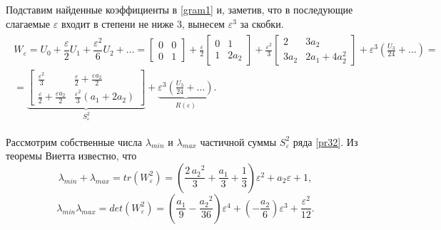 \documentclass[../main.tex]{subfiles}
\begin{document}
 Подставим найденные коэффициенты в \eqref{gram1} и, заметив, что в последующие слагаемые $ \varepsilon $ входит в степени не ниже $ 3 $, вынесем $ \varepsilon^3 $ за скобки.
 \begin{gather}\label{pr32}
	 \begin{gathered}
		 W_{\varepsilon} = U_0 + \dfrac{\varepsilon}{2} U_1 + \dfrac{\varepsilon^2}{6}U_2 + \dots = \left[ {\begin{array}{*{20}{c}}
				 0&0\\
				 0&1
		 \end{array}}\right] +\frac{\varepsilon}{2} \left[ {\begin{array}{*{20}{c}}
				 0&1\\
				 1&2a_2
		 \end{array}}\right] +\frac{\varepsilon^2}{3} \left[ {\begin{array}{*{20}{c}}
				 2&3a_2\\
				 3a_2&2a_1+4a_2^2
		 \end{array}}\right] + \varepsilon^3 \left( \frac{U_3}{24} + \dots \right) =
		 \\
		 = \underbrace{\left[ \begin{array}{*{20}{c}}
				 \frac{\varepsilon^2}{3} & \frac{\varepsilon}{2} + \frac{\varepsilon a_2}{2} \\ 
				 \frac{\varepsilon}{2} + \frac{\varepsilon a_2}{2} & \frac{\varepsilon^2}{3}(a_1+2a_2) 
			 \end{array} \right]}_{S_{\varepsilon}^{2}} + \underbrace{ \varepsilon^3 \left( \frac{U_3}{24} + \dots \right)}_{R(\varepsilon)}.
	 \end{gathered}
 \end{gather}
 
 
 Рассмотрим собственные числа $ \lambda_{min} $ и $ \lambda_{max} $ частичной суммы $ S_{\varepsilon}^{2} $ ряда \eqref{pr32}. Из теоремы Виетта известно, что 
 \begin{equation}\label{lambdamax}
	 \lambda_{min} + \lambda_{max} = tr(W_{\varepsilon}^{2}) = \left(\frac{2\,{a_{2}}^2}{3}+\frac{a_{1}}{3}+\frac{1}{3}\right)\varepsilon^2+a_{2}\varepsilon+1,
 \end{equation}
 \begin{equation}\label{lambdamin}
	 \lambda_{min}  \lambda_{max} = det(W_{\varepsilon}^{2}) = \left(\frac{a_{1}}{9}-\frac{{a_{2}}^2}{36}\right)\varepsilon^4+\left(-\frac{a_{2}}{6}\right)\varepsilon^3+\frac{\varepsilon^2}{12}.
 \end{equation}
 
\end{document}
